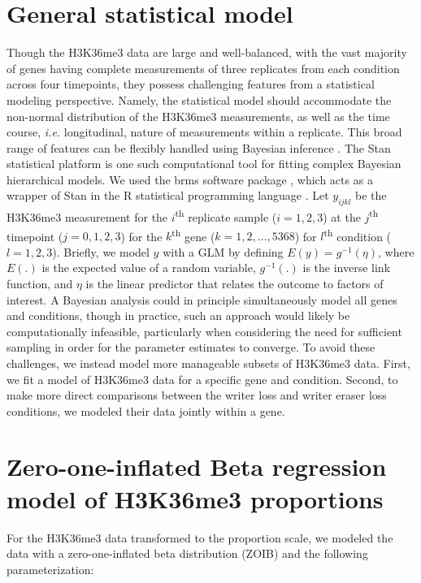 \documentclass[12pt]{extarticle}
\newcommand{\ie}{\emph{i.e.}\xspace}
\begin{document}
\section*{General statistical model}
Though the H3K36me3 data are large and well-balanced, with the vast majority of genes having complete measurements of three replicates from each condition across four timepoints, they possess challenging features from a statistical modeling perspective. Namely, the statistical model should accommodate the non-normal distribution of the H3K36me3 measurements, as well as the time course, \ie longitudinal, nature of measurements within a replicate. This broad range of features can be flexibly handled using Bayesian inference \cite{Gelman2006}. 
	The Stan statistical platform \cite{Carpenter2017} is one such computational tool for fitting complex Bayesian hierarchical models. We used the brms software package \cite{Burkner2017, Burkner2018}, which acts as a wrapper of Stan in the R statistical programming language \cite{RCoreTeam2019}. Let $y_{ijkl}$ be the H3K36me3 measurement for the $i$\textsuperscript{th} replicate sample ($i=1,2,3$) at the $j$\textsuperscript{th} timepoint ($j=0,1,2,3$) for the $k$\textsuperscript{th} gene ($k=1,2,…,5368$) for $l$\textsuperscript{th} condition ($l=1,2,3$). Briefly, we model $y$ with a GLM by defining $E(y)=g^{-1}(\eta)$, where $E(.)$ is the expected value of a random variable, $g^{-1}(.)$ is the inverse link function, and $\eta$ is the linear predictor that relates the outcome to factors of interest.
	A Bayesian analysis could in principle simultaneously model all genes and conditions, though in practice, such an approach would likely be computationally infeasible, particularly when considering the need for sufficient sampling in order for the parameter estimates to converge. To avoid these challenges, we instead model more manageable subsets of H3K36me3 data. First, we fit a model of H3K36me3 data for a specific gene and condition. Second, to make more direct comparisons between the writer loss and writer eraser loss conditions, we modeled their data jointly within a gene.
	
\section*{Zero-one-inflated Beta regression model of H3K36me3 proportions}
For the H3K36me3 data transformed to the proportion scale, we modeled the data with a zero-one-inflated beta distribution (ZOIB) and the following parameterization:







\end{document}
